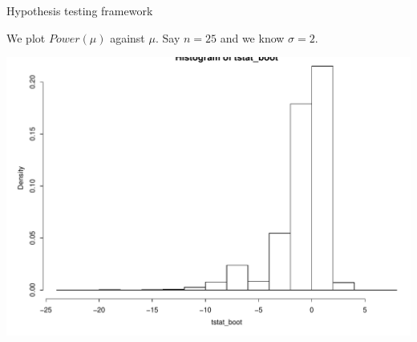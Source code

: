 \documentclass{beamer}\usepackage[]{graphicx}\usepackage[]{color}
\newenvironment{knitrout}{}{} %
\renewenvironment{knitrout}{\begin{spacing}{0.75}\begin{tiny}}{\end{tiny}\end{spacing}}
\begin{document}
\begin{frame}{Hypothesis testing framework}

We plot $Power(\mu)$ against $\mu$.  Say $n=25$ and we know $\sigma=2$. \newline

\begin{knitrout}\small
{}\color{fgcolor}

{\centering \includegraphics[width=0.99\linewidth]{figure/graphics-unnamed-chunk-2-1} 

}



\end{knitrout}

\end{frame}
\end{document}
